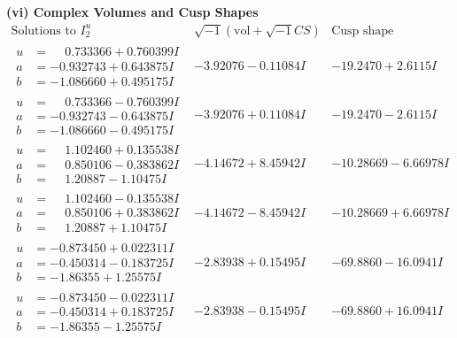 \documentclass[1p]{elsarticle_modified}
\theoremstyle{definition}
\newcommand{\I}{\sqrt{-1}}
\begin{document}
\newpage\flushleft \textbf{(vi) Complex Volumes and Cusp Shapes}
$$\begin{array}{c|c|c}  
\text{Solutions to }I^u_{2}& \I (\text{vol} + \sqrt{-1}CS) & \text{Cusp shape}\\
 \hline 
\begin{aligned}
u &= \phantom{-}0.733366 + 0.760399 I \\
a &= -0.932743 + 0.643875 I \\
b &= -1.086660 + 0.495175 I\end{aligned}
 & -3.92076 - 0.11084 I & -19.2470 + 2.6115 I \\ \hline\begin{aligned}
u &= \phantom{-}0.733366 - 0.760399 I \\
a &= -0.932743 - 0.643875 I \\
b &= -1.086660 - 0.495175 I\end{aligned}
 & -3.92076 + 0.11084 I & -19.2470 - 2.6115 I \\ \hline\begin{aligned}
u &= \phantom{-}1.102460 + 0.135538 I \\
a &= \phantom{-}0.850106 - 0.383862 I \\
b &= \phantom{-}1.20887 - 1.10475 I\end{aligned}
 & -4.14672 + 8.45942 I & -10.28669 - 6.66978 I \\ \hline\begin{aligned}
u &= \phantom{-}1.102460 - 0.135538 I \\
a &= \phantom{-}0.850106 + 0.383862 I \\
b &= \phantom{-}1.20887 + 1.10475 I\end{aligned}
 & -4.14672 - 8.45942 I & -10.28669 + 6.66978 I \\ \hline\begin{aligned}
u &= -0.873450 + 0.022311 I \\
a &= -0.450314 - 0.183725 I \\
b &= -1.86355 + 1.25575 I\end{aligned}
 & -2.83938 + 0.15495 I & -69.8860 - 16.0941 I \\ \hline\begin{aligned}
u &= -0.873450 - 0.022311 I \\
a &= -0.450314 + 0.183725 I \\
b &= -1.86355 - 1.25575 I\end{aligned}
 & -2.83938 - 0.15495 I & -69.8860 + 16.0941 I \\ \hline\begin{aligned}

\end{aligned}
\end{array}$$
\end{document}
